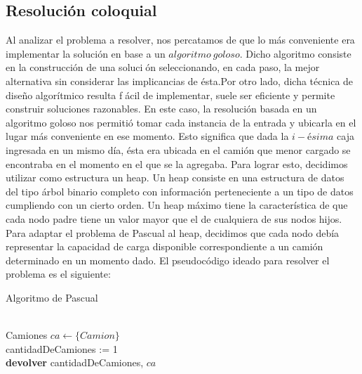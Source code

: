 \subsection{Resolución coloquial}
Al analizar el problema a resolver, nos percatamos de que lo más conveniente era implementar la solución en base a un $algoritmo\ goloso$. Dicho algoritmo consiste en la construcción de una solución seleccionando, en cada paso, la mejor alternativa sin considerar las implicancias de ésta.\newline Por otro lado, dicha técnica de diseño algorítmico resulta fácil de implementar, suele ser eficiente y permite construir soluciones razonables.\newline
\newline
En este caso, la resolución basada en un algoritmo goloso nos permitió tomar cada instancia de la entrada y ubicarla en el lugar más conveniente en ese momento. Esto significa que dada la $i-ésima$ caja ingresada en un mismo día, ésta era ubicada en el camión que menor cargado se encontraba en el momento en el que se la agregaba. Para lograr esto, decidimos utilizar como estructura un heap.\newline
\newline
Un heap consiste en una estructura de datos del tipo árbol binario completo con información perteneciente a un tipo de datos cumpliendo con un cierto orden. Un heap máximo tiene la característica de que cada nodo padre tiene un valor mayor que el de cualquiera de sus nodos hijos.\newline
Para adaptar el problema de Pascual al heap, decidimos que cada nodo debía representar la capacidad de carga disponible correspondiente a un camión determinado en un momento dado.\newline
\newline
El pseudocódigo ideado para resolver el problema es el siguiente:\newline

\begin{algorithm}[H]
	\SetAlgoLined
	\caption{Algoritmo de Pascual}
	\\
	
	Camiones $ca \leftarrow \{Camion\}$\\
	cantidadDeCamiones := 1\\
	\textbf{devolver} cantidadDeCamiones, $ca$



\end{algorithm}


